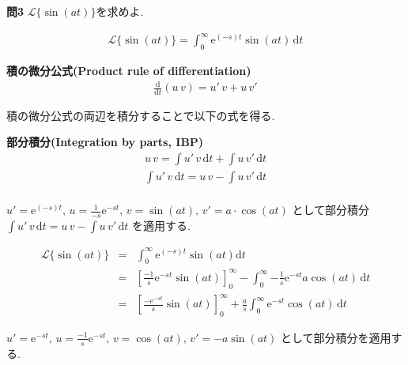 ﻿\documentclass[a4j]{jarticle}
\begin{document}
\noindent
{\large {\bf 問3}} \/ \( \mathcal{L} \{ \sin(at) \} \)を求めよ.

\begin{eqnarray*}
\mathcal{L} \{ \sin(at) \} = \int_0^\infty \mathrm{e}^{(-s)t} \sin(at) \, \mathrm{d}t
\end{eqnarray*}

\begin{itembox}[l]{{\large {\bf 積の微分公式(Product rule of differentiation)}}}
\begin{eqnarray*}
\frac{\mathrm{d}}{\mathrm{d}t}(u\,v) = u'\,v + u\,v'
\end{eqnarray*}
\end{itembox}

積の微分公式の両辺を積分することで以下の式を得る.

\begin{itembox}[l]{{\large {\bf 部分積分(Integration by parts, IBP)}}}
\begin{eqnarray*}
u\,v = \int{ u'\,v } \, \mathrm{d}t + \int{ u\,v' }  \, \mathrm{d}t \\
\int{ u'\,v } \, \mathrm{d}t = u\,v - \int{ u\,v' } \, \mathrm{d}t \\
\end{eqnarray*}
\end{itembox}

\( u' = \mathrm{e}^{(-s)t} ,\, u = \frac{1}{-s}\mathrm{e}^{-st} ,\, v = \sin(at) ,\, v' = a \cdot \cos(at) \)
として部分積分\( \int{ u'\,v } \, \mathrm{d}t = u\,v - \int{ u\,v' } \, \mathrm{d}t \) を適用する.

\begin{eqnarray*}
\mathcal{L} \{ \sin(at) \} &=& \int_0^\infty \mathrm{e}^{(-s)t} \sin (at) \mathrm{d}t \\
                           &=& \left[ \frac{-1}{s}\mathrm{e}^{-st}\sin(at) \right]_0^\infty - \int_0^\infty{- \frac{1}{s} \mathrm{e}^{-st} a \cos(at) \, \mathrm{d}t } \\
                           &=& \left[ \frac{-\mathrm{e}^{-st}}{s}\sin(at) \right]_0^\infty + \frac{a}{s} \int_0^\infty{ \mathrm{e}^{-st} \cos(at) \, \mathrm{d}t }
\end{eqnarray*}

\( u' = \mathrm{e}^{-st} ,\, u=\frac{-1}{s}\mathrm{e}^{-st} ,\, v = \cos(at) ,\, v' = -a\sin(at) \) として部分積分を適用する.
\end{document}
